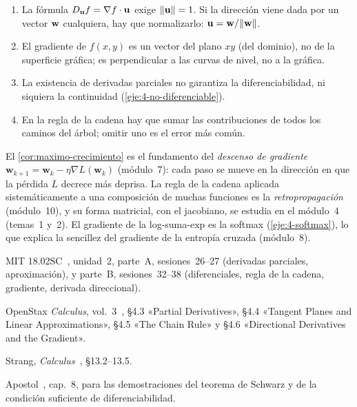 \begin{observacion}
\begin{enumerate}[label=(\alph*)]
\item La fórmula $D_{\mathbf{u}}f=\nabla f\cdot\mathbf{u}$ exige $\lVert\mathbf{u}\rVert=1$. Si la dirección viene dada por un vector $\mathbf{w}$ cualquiera, hay que normalizarlo: $\mathbf{u}=\mathbf{w}/\lVert\mathbf{w}\rVert$.
\item El gradiente de $f(x,y)$ es un vector del plano $xy$ (del dominio), no de la superficie gráfica; es perpendicular a las curvas de nivel, no a la gráfica.
\item La existencia de derivadas parciales no garantiza la diferenciabilidad, ni siquiera la continuidad (\cref{eje:4-no-diferenciable}).
\item En la regla de la cadena hay que sumar las contribuciones de todos los caminos del árbol; omitir uno es el error más común.
\end{enumerate}
\end{observacion}

\begin{observacion}
El \cref{cor:maximo-crecimiento} es el fundamento del \emph{descenso de gradiente} $\mathbf w_{k+1}=\mathbf w_k-\eta\nabla L(\mathbf w_k)$ (módulo~7): cada paso se mueve en la dirección en que la pérdida $L$ decrece más deprisa. La regla de la cadena aplicada sistemáticamente a una composición de muchas funciones es la \emph{retropropagación} (módulo~10), y su forma matricial, con el jacobiano, se estudia en el módulo~4 (temas~1 y~2). El gradiente de la log-suma-exp es la softmax (\cref{eje:4-softmax}), lo que explica la sencillez del gradiente de la entropía cruzada (módulo~8).
\end{observacion}

\begin{lecturas}
\item MIT 18.02SC~\cite{mit1802}, unidad~2, parte~A, sesiones~26--27 (derivadas parciales, aproximación), y parte~B, sesiones~32--38 (diferenciales, regla de la cadena, gradiente, derivada direccional).
\item OpenStax \emph{Calculus}, vol.~3~\cite{openstax3}, §4.3 «Partial Derivatives», §4.4 «Tangent Planes and Linear Approximations», §4.5 «The Chain Rule» y §4.6 «Directional Derivatives and the Gradient».
\item Strang, \emph{Calculus}~\cite{strangcalc}, §13.2--13.5.
\item Apostol~\cite{apostol2}, cap.~8, para las demostraciones del teorema de Schwarz y de la condición suficiente de diferenciabilidad.
\end{lecturas}

